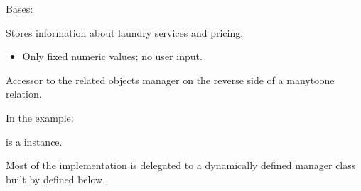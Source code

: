 \documentclass[letterpaper,10pt,english]{sphinxmanual}
\begin{document}
\begin{fulllineitems}
\label{\detokenize{index:core.models.LaundryInfo}}
\pysigstartsignatures
\pysiglinewithargsret
{}
{\sphinxparamcomma {}}
{}
\pysigstopsignatures
\sphinxAtStartPar
Bases: 

\sphinxAtStartPar
Stores information about laundry services and pricing.
\begin{description}
\begin{itemize}
\item {} 
\sphinxAtStartPar
Only fixed numeric values; no user input.

\end{itemize}

\end{description}

\begin{fulllineitems}
\label{\detokenize{index:core.models.LaundryInfo.translations}}
\pysigstartsignatures
\pysigline
{}
\pysigstopsignatures
\sphinxAtStartPar
Accessor to the related objects manager on the reverse side of a
many\sphinxhyphen{}to\sphinxhyphen{}one relation.

\sphinxAtStartPar
In the example:

\begin{sphinxVerbatim}[commandchars=\\\{\}]
       
\end{sphinxVerbatim}

\sphinxAtStartPar
{} is a  instance.

\sphinxAtStartPar
Most of the implementation is delegated to a dynamically defined manager
class built by  defined below.


\end{fulllineitems}
\end{fulllineitems}
\end{document}
